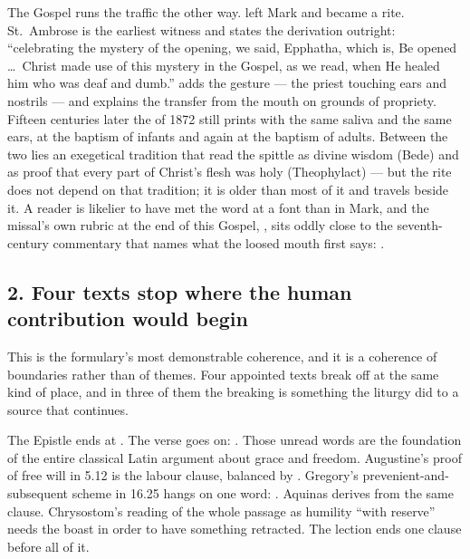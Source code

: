 The Gospel runs the traffic the other way.  left Mark and
became a rite. St.~Ambrose is the earliest witness and states the derivation
outright: ``celebrating the mystery of the opening, we said, Epphatha, which is,
Be opened \dots\ Christ made use of this mystery in the Gospel, as we read, when
He healed him who was deaf and dumb.''  adds the gesture
--- the priest touching ears and nostrils --- and explains the transfer from the
mouth on grounds of propriety. Fifteen centuries later the  of 1872 still prints  with the
same saliva and the same ears, at the baptism of infants and again at the
baptism of adults. Between the two lies an exegetical tradition that read the
spittle as divine wisdom (Bede) and as proof that every part of Christ's flesh
was holy (Theophylact) --- but the rite does not depend on that tradition; it is
older than most of it and travels beside it. A reader is likelier to have met
the word at a font than in Mark, and the missal's own rubric at the end of this
Gospel, , sits oddly close to the seventh-century commentary that
names what the loosed mouth first says: .

\subsection*{2. Four texts stop where the human contribution would begin}

This is the formulary's most demonstrable coherence, and it is a coherence of
boundaries rather than of themes. Four appointed texts break off at the same
kind of place, and in three of them the breaking is something the liturgy did
to a source that continues.

The Epistle ends at . The verse goes
on: . Those unread words are the foundation of the entire classical Latin
argument about grace and freedom. Augustine's proof of free will in
 5.12 is the labour clause, balanced by
. Gregory's
prevenient-and-subsequent scheme in  16.25 hangs on one word:
. Aquinas derives  from
the same clause. Chrysostom's reading of the whole passage as humility ``with
reserve'' needs the boast in order to have something retracted. The lection
ends one clause before all of it.

